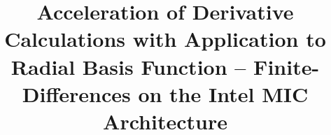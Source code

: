 \documentclass{sig-alternate}
\newcommand{\todo}[1]{{\color{red}\textbf{\hl{#1}}\xspace}}
\begin{document}
\title{Acceleration of Derivative Calculations with Application to Radial Basis Function --
Finite-Differences on the Intel MIC Architecture}



\maketitle


\end{document}
